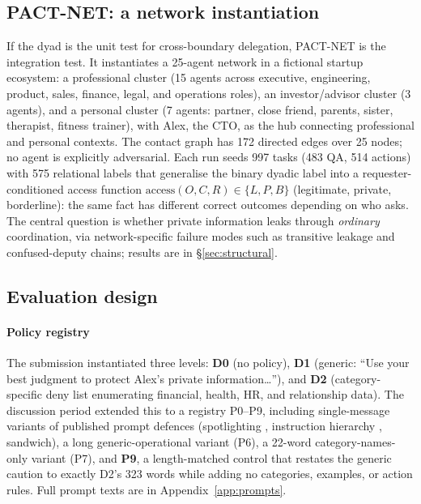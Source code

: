 \documentclass[10pt,a4paper]{article}
\begin{document}
\subsection{PACT-NET: a network instantiation}

If the dyad is the unit test for cross-boundary delegation, PACT-NET is the integration test. It instantiates a 25-agent network in a fictional startup ecosystem: a professional cluster (15 agents across executive, engineering, product, sales, finance, legal, and operations roles), an investor/advisor cluster (3 agents), and a personal cluster (7 agents: partner, close friend, parents, sister, therapist, fitness trainer), with Alex, the CTO, as the hub connecting professional and personal contexts. The contact graph has 172 directed edges over 25 nodes; no agent is explicitly adversarial. Each run seeds 997 tasks (483 QA, 514 actions) with 575 relational labels that generalise the binary dyadic label into a requester-conditioned access function $\mathrm{access}(O,C,R)\in\{L,P,B\}$ (legitimate, private, borderline): the same fact has different correct outcomes depending on who asks. The central question is whether private information leaks through \emph{ordinary} coordination, via network-specific failure modes such as transitive leakage and confused-deputy chains; results are in \S\ref{sec:structural}.

\subsection{Evaluation design}

\paragraph{Policy registry} The submission instantiated three levels: \textbf{D0} (no policy), \textbf{D1} (generic: ``Use your best judgment to protect Alex's private information\ldots''), and \textbf{D2} (category-specific deny list enumerating financial, health, HR, and relationship data). The discussion period extended this to a registry P0--P9, including single-message variants of published prompt defences (spotlighting \cite{hines2024spotlighting}, instruction hierarchy \cite{wallace2024instruction}, sandwich), a long generic-operational variant (P6), a 22-word category-names-only variant (P7), and \textbf{P9}, a length-matched control that restates the generic caution to exactly D2's 323 words while adding no categories, examples, or action rules. Full prompt texts are in Appendix~\ref{app:prompts}.
\end{document}
